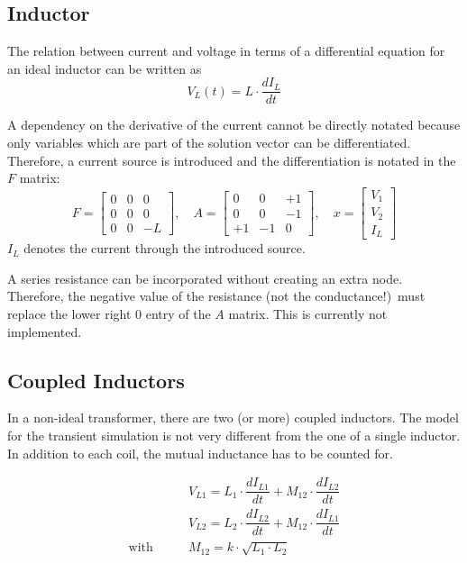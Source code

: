 \subsection{Inductor}

The relation between current and voltage in terms of a differential
equation for an ideal inductor can be written as
\begin{equation}
V_L(t) = L\cdot \dfrac{d I_L}{d t}
\end{equation}

A dependency on the derivative of the current cannot be directly
notated because only variables which are part of the solution vector
can be differentiated.  Therefore, a current source is introduced and
the differentiation is notated in the $F$ matrix:
\begin{equation}
F=
\begin{bmatrix}
0 & 0 & 0\\
0 & 0 & 0\\
0 & 0 & -L
\end{bmatrix},\quad
A=
\begin{bmatrix}
0 & 0 & +1\\
0 & 0 & -1\\
+1 & -1 & 0
\end{bmatrix},\quad
x=
\begin{bmatrix}
V_1\\
V_2\\
I_L
\end{bmatrix}
\end{equation}
$I_L$ denotes the current through the introduced source.

A series resistance can be incorporated without creating an extra
node.  Therefore, the negative value of the resistance (not the
conductance!)\ must replace the lower right $0$ entry of the $A$
matrix.  This is currently not implemented.

\subsection{Coupled Inductors}

In a non-ideal transformer, there are two (or more) coupled inductors.
The model for the transient simulation is not very different from the
one of a single inductor. In addition to each coil, the mutual inductance
has to be counted for.

\begin{align}
 & V_{L1} = L_1\cdot\dfrac{d I_{L1}}{d t} + M_{12}\cdot\dfrac{d I_{L2}}{d t} \\
 & V_{L2} = L_2\cdot\dfrac{d I_{L2}}{d t} + M_{12}\cdot\dfrac{d I_{L1}}{d t} \\
\text{with}\qquad & M_{12} = k\cdot\sqrt{L_1\cdot L_2}
\end{align}

